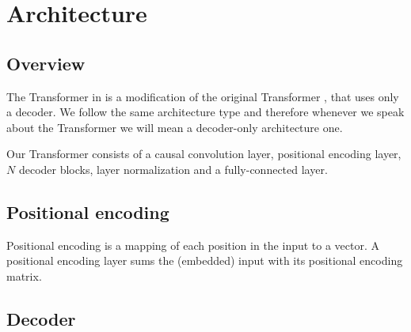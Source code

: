 \documentclass[en]{pracamgr}
\begin{document}
%


\section{Architecture}

\subsection{Overview}

The Transformer in \cite{enhancing} is a modification of the original Transformer \cite{tr}, that uses only a decoder.
We follow the same architecture type and therefore whenever we speak about the Transformer we will mean a decoder-only \cite{wikipedia} architecture one.

Our Transformer consists of a causal convolution layer, positional encoding layer, $N$ decoder blocks, layer normalization and a fully-connected layer.

\subsection{Positional encoding}

Positional encoding is a mapping of each position in the input to a vector.
A positional encoding layer sums the (embedded) input with its positional encoding matrix.

\subsection{Decoder}
\end{document}
